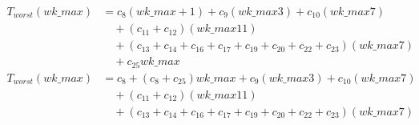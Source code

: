 \begin{subequations}
\label{eq:analyse-arlabeling-calcregiondata-2}
\begin{align}
\label{eq:analyse-arlabeling-calcregiondata-2-1}
T_{worst}(\mathit{wk\_max})& = c_{8} (\mathit{wk\_max} + 1) + c_{9}(\mathit{wk\_max}3) + c_{10}(\mathit{wk\_max} 7) \\
& \quad + (c_{11} + c_{12})(\mathit{wk\_max}11) \nonumber \\
& \quad + (c_{13} + c_{14} + c_{16} + c_{17} + c_{19} + c_{20} + c_{22} + c_{23})(\mathit{wk\_max}7) \nonumber \\
& \quad + c_{25}\mathit{wk\_max} \nonumber \\
\label{eq:analyse-arlabeling-calcregiondata-2-2}
T_{worst}(\mathit{wk\_max})& = c_{8} + (c_{8} + c_{25})\mathit{wk\_max} + c_{9}(\mathit{wk\_max}3)
 + c_{10}(\mathit{wk\_max} 7) \\
& \quad + (c_{11} + c_{12})(\mathit{wk\_max}11) \nonumber \\
& \quad + (c_{13} + c_{14} + c_{16} + c_{17} + c_{19} + c_{20} + c_{22} + c_{23})(\mathit{wk\_max}7) \nonumber
\end{align}	
\end{subequations}
